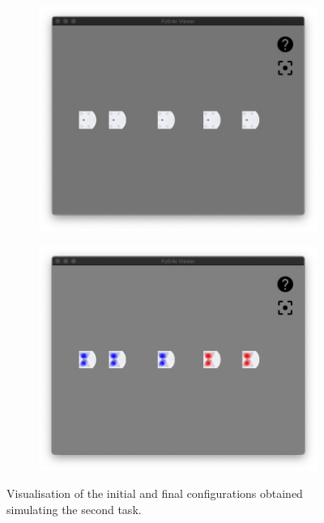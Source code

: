 \begin{figure}[!htb]
	\begin{center}
		\begin{subfigure}[h]{0.49\textwidth}
			\centering
			\includegraphics[width=\textwidth]{contents/images/task2init}
		\end{subfigure}
		\hfill
		\begin{subfigure}[h]{0.49\textwidth}
			\centering
			\includegraphics[width=\textwidth]{contents/images/task2final}
		\end{subfigure}
	\end{center}
	\vspace{-0.5cm}
	\caption[Visualisation of the simulation of the second task.]{Visualisation of the 
		initial and final configurations obtained simulating the second task.}
	\label{fig:task2}
\end{figure}
